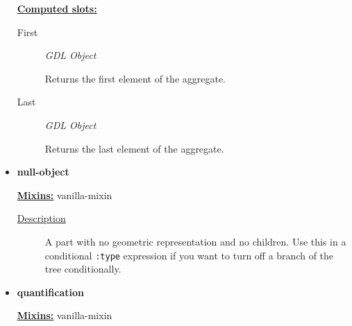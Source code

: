 \documentclass [11pt]{book}
\begin{document}
\begin{itemize}
\begin{description}
\end{description}








\textbf{
\underline{Computed slots:}}

\begin{description}

\item [First]
\emph{GDL Object}

 Returns the first element of the aggregate.




\item [Last]
\emph{GDL Object}

 Returns the last element of the aggregate.




\end{description}







\item {}
\label{prim:null-object}
\textbf{null-object}


\textbf{
\underline{Mixins:}} vanilla-mixin





\begin{description}

\item [
\underline{Description}]


A part with no geometric representation and no children. Use this in a 
conditional \texttt{:type} expression if you want to turn off a branch of the tree conditionally.



\end{description}









\item {}
\label{prim:quantification}
\textbf{quantification}


\textbf{
\underline{Mixins:}} vanilla-mixin





\begin{description}


\end{description}
\end{itemize}
\end{document}
